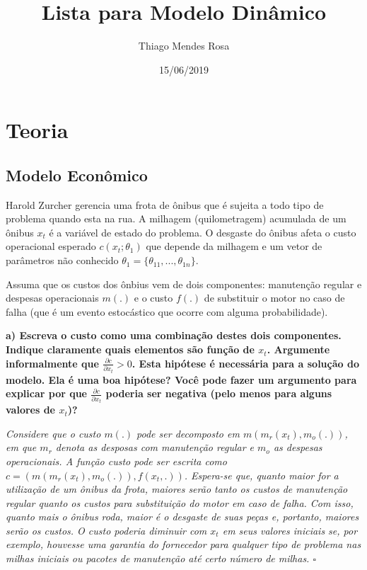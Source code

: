 \documentclass[12pt,a4paper]{article}
\title{Lista para Modelo Dinâmico}
\author{Thiago Mendes Rosa}
\date{15/06/2019}
\begin{document}
\maketitle

\hypertarget{teoria}{%
\section{Teoria}\label{teoria}}

\hypertarget{modelo-economico}{%
\subsection{Modelo Econômico}\label{modelo-economico}}

Harold Zurcher gerencia uma frota de ônibus que é sujeita a todo tipo de
problema quando esta na rua. A milhagem (quilometragem) acumulada de um
ônibus \(x_t\) é a variável de estado do problema. O desgaste do ônibus
afeta o custo operacional esperado \(c(x_t; \theta_1)\) que depende da
milhagem e um vetor de parâmetros não conhecido
\(\theta_1 = \{\theta_{11}, . . . , \theta_{1n}\}\).

Assuma que os custos dos ônbius vem de dois componentes: manutenção
regular e despesas operacionais \(m(.)\) e o custo \(f(.)\) de
substituir o motor no caso de falha (que é um evento estocástico que
ocorre com alguma probabilidade).

\textbf{a) Escreva o custo como uma combinação destes dois componentes.
Indique claramente quais elementos são função de \(x_t\). Argumente
informalmente que \(\frac{\partial c}{\partial x_t} > 0\). Esta hipótese
é necessária para a solução do modelo. Ela é uma boa hipótese? Você pode
fazer um argumento para explicar por que
\(\frac{\partial c}{\partial x_t}\) poderia ser negativa (pelo menos
para alguns valores de \(x_t\))?}

\emph{Considere que o custo \(m(.)\) pode ser decomposto em
\(m(m_r(x_t),m_o(.))\), em que \(m_r\) denota as desposas com manutenção
regular e \(m_o\) as despesas operacionais. A função custo pode ser
escrita como \(c=(m(m_r(x_t),m_o(.)),f(x_t,.))\). Espera-se que, quanto
maior for a utilização de um ônibus da frota, maiores serão tanto os
custos de manutenção regular quanto os custos para substituição do motor
em caso de falha. Com isso, quanto mais o ônibus roda, maior é o
desgaste de suas peças e, portanto, maiores serão os custos. O custo
poderia diminuir com \(x_t\) em seus valores iniciais se, por exemplo,
houvesse uma garantia do fornecedor para qualquer tipo de problema nas
milhas iniciais ou pacotes de manutenção até certo número de milhas.
\(\square\)}
\end{document}
